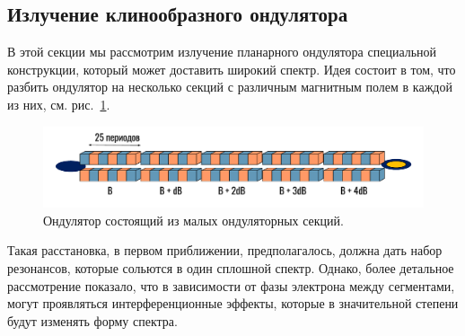 \subsection{Излучение клинообразного ондулятора}
В этой секции мы рассмотрим излучение планарного ондулятора специальной конструкции, который может доставить широкий спектр. Идея состоит в том, что разбить ондулятор на несколько секций с различным магнитным полем в каждой из них, см. рис.~\ref{fig:section_und_sheme}.
\begin{figure}[h]
	\centering  
	\includegraphics[width=\textwidth]{pic/und.pdf}
	\caption{Ондулятор состоящий из малых ондуляторных секций.}
	\label{fig:section_und_sheme}  
\end{figure}
Такая расстановка, в первом приближении, предполагалось, должна дать набор резонансов, которые сольются в один сплошной спектр. Однако, более детальное рассмотрение показало, что в зависимости от фазы электрона между сегментами, могут проявляться интерференционные эффекты, которые в значительной степени будут изменять форму спектра. 

